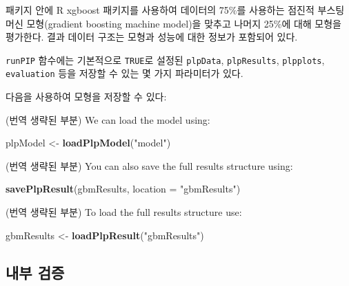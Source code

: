 \documentclass[11pt]{book}
\newenvironment{Shaded}{\begin{snugshade}}{\end{snugshade}}
\newcommand{\KeywordTok}[1]{\textcolor[rgb]{0.13,0.29,0.53}{\textbf{#1}}}
\newcommand{\DataTypeTok}[1]{\textcolor[rgb]{0.13,0.29,0.53}{#1}}
\newcommand{\StringTok}[1]{\textcolor[rgb]{0.31,0.60,0.02}{#1}}
\newcommand{\OperatorTok}[1]{\textcolor[rgb]{0.81,0.36,0.00}{\textbf{#1}}}
\newcommand{\NormalTok}[1]{#1}
\theoremstyle{definition}
\theoremstyle{definition}
\theoremstyle{definition}
\theoremstyle{remark}
\begin{document}
패키지 안에 R xgboost 패키지를 사용하여 데이터의 75\%를 사용하는 점진적
부스팅 머신 모형(gradient boosting machine model)을 맞추고 나머지 25\%에
대해 모형을 평가한다. 결과 데이터 구조는 모형과 성능에 대한 정보가
포함되어 있다.

\texttt{runPIP} 함수에는 기본적으로 \texttt{TRUE}로 설정된
\texttt{plpData}, \texttt{plpResults}, \texttt{plpplots},
\texttt{evaluation} 등을 저장할 수 있는 몇 가지 파라미터가 있다.

다음을 사용하여 모형을 저장할 수 있다:

\begin{Shaded}
\end{Shaded}

(번역 생략된 부분) We can load the model using:

\begin{Shaded}
\begin{Highlighting}[]
\NormalTok{plpModel <-}\StringTok{ }\KeywordTok{loadPlpModel}\NormalTok{(}\StringTok{"model"}\NormalTok{)}
\end{Highlighting}
\end{Shaded}

(번역 생략된 부분) You can also save the full results structure using:

\begin{Shaded}
\begin{Highlighting}[]
\KeywordTok{savePlpResult}\NormalTok{(gbmResults, }\DataTypeTok{location =} \StringTok{"gbmResults"}\NormalTok{)}
\end{Highlighting}
\end{Shaded}

(번역 생략된 부분) To load the full results structure use:

\begin{Shaded}
\begin{Highlighting}[]
\NormalTok{gbmResults <-}\StringTok{ }\KeywordTok{loadPlpResult}\NormalTok{(}\StringTok{"gbmResults"}\NormalTok{)}
\end{Highlighting}
\end{Shaded}

\subsection{내부 검증}\label{-}
\end{document}

